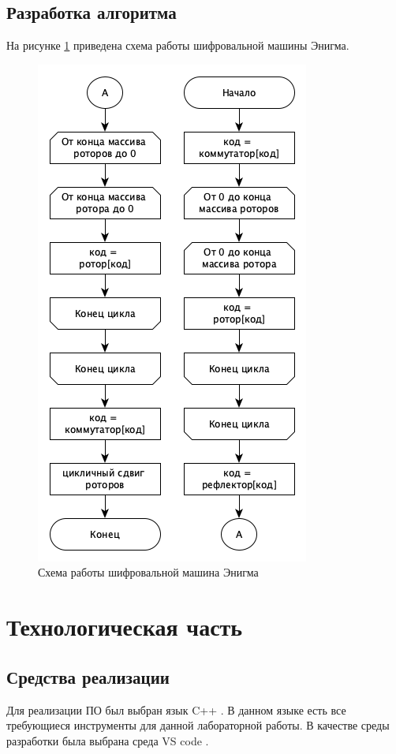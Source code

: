 \subsection{Разработка алгоритма}

На рисунке \ref{fig:alg} приведена схема работы шифровальной машины Энигма.


\begin{figure}[ht!]
	\centering
	\includegraphics[width=0.6\linewidth]{assets/graphs/enigma-algo.png}
	\caption{Схема работы шифровальной машина Энигма}
	\label{fig:alg}
\end{figure}

\clearpage

\section{Технологическая часть}

\subsection{Средства реализации}

Для реализации ПО был выбран язык C++ \cite{c++}.
В данном языке есть все требующиеся инструменты для данной лабораторной работы.
В качестве среды разработки была выбрана среда VS code \cite{vscode}.

